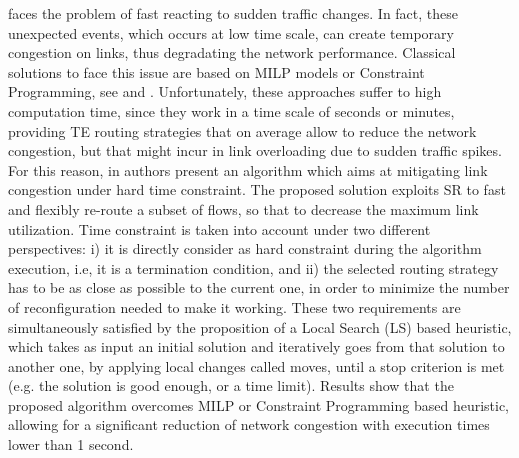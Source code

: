 \cite{gay2017expect} faces the problem of fast reacting to sudden traffic changes. In fact, these unexpected events, which occurs at low time scale, can create temporary congestion on links, thus degradating the network performance.
Classical solutions to face this issue are based on MILP models or Constraint Programming, see \cite{optimizedte} and \cite{defo1}. Unfortunately, these approaches suffer to high computation time, since they work in a time scale of seconds or minutes, providing TE routing strategies that on average allow to reduce the network congestion, but that might incur in link overloading due to sudden traffic spikes.
For this reason, in \cite{gay2017expect} authors present an algorithm which aims at mitigating link congestion under hard time constraint.
The proposed solution exploits SR to fast and flexibly re-route a subset of flows, so that to decrease the maximum link utilization. Time constraint is taken into account under two different perspectives: i) it is directly consider as hard constraint during the algorithm execution, i.e, it is a termination condition, and ii) the selected routing strategy has to be as close as possible to the current one, in order to minimize the number of reconfiguration needed to make it working.
These two requirements are simultaneously satisfied by the proposition of a Local Search (LS) based heuristic, which takes as input an initial solution and iteratively goes from that solution to another one, by applying local changes called moves, until a stop criterion is met (e.g. the solution is good enough, or a time limit). 
Results show that the proposed algorithm overcomes MILP or Constraint Programming based heuristic, allowing for a significant reduction of network congestion with execution times lower than 1 second.

